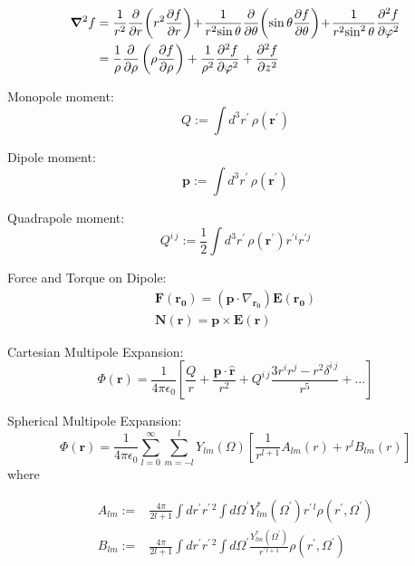 \documentclass[a4paper, twocolumn]{article}
\renewcommand{\vec}[1]{\boldsymbol{#1}}
\begin{document}
\begin{align*}
    \vec{\nabla}^2 f
    &= {1 \over r^2}{\partial \over \partial r}\!\left(r^2 {\partial f \over \partial r}\right)
\!+\!{1 \over r^2\!\sin\theta}{\partial \over \partial \theta}\!\left(\sin\theta {\partial f \over \partial \theta}\right)
\!+\!{1 \over r^2\!\sin^2\theta}{\partial^2 f \over \partial \varphi^2} \\
    &= {1 \over \rho}{\partial \over \partial \rho}\left(\rho {\partial f \over \partial \rho}\right)
+ {1 \over \rho^2}{\partial^2 f \over \partial \varphi^2}
+ {\partial^2 f \over \partial z^2}
\end{align*}

Monopole moment:
\begin{equation*}
    Q := \int d^{3}r^{\prime} \, \rho(\vec{r}^{\prime})
\end{equation*}

Dipole moment:
\begin{equation*}
    \vec{p} := \int d^{3}r^{\prime} \, \rho(\vec{r}^{\prime})
\end{equation*}

Quadrapole moment:
\begin{equation*}
    Q^{i \, j} := \frac{1}{2} \int d^{3} r^{\prime} \, \rho(\vec{r}^{\prime}) r^{\prime i} r^{\prime j}
\end{equation*}

Force and Torque on Dipole:
\begin{align*}
    \vec{F}(\vec{r_{0}}) = (\vec{p} \cdot \nabla_{\vec{r_{0}}}) \vec{E}(\vec{r_{0}}) \\
    \vec{N}(\vec{r}) = \vec{p} \times \vec{E}(\vec{r})
\end{align*}

Cartesian Multipole Expansion:
\begin{equation*}
    \Phi(\vec{r}) = \frac{1}{4 \pi \epsilon_{0}} \left[ \frac{Q}{r} + \frac{\vec{p} \cdot \hat{\vec{r}}}{r^{2}} + Q^{i \, j} \frac{3r^{i}r^{j} - r^{2}\delta^{i\,j}}{r^5} + \dots \right]
\end{equation*}

Spherical Multipole Expansion:
\begin{equation*}
    \Phi(\vec{r}) = \frac{1}{4 \pi \epsilon_{0}} \sum\limits_{l=0}^{\infty} \sum\limits_{m=-l}^{l} Y_{lm}(\Omega) \left[ \frac{1}{r^{l+1}} A_{lm}(r) + r^{l} B_{lm}(r) \right]
\end{equation*}
where

\begin{align*}
    A_{lm} :=& \frac{4 \pi}{2l + 1} \int d r^{\prime} r^{\prime \, 2} \int d \Omega^{\prime} Y_{lm}^{*}(\Omega^{\prime}) r^{\prime \, l} \rho(r^{\prime}, \Omega^{\prime}) \\
    B_{lm} :=& \frac{4 \pi}{2l + 1} \int d r^{\prime} r^{\prime \, 2} \int d \Omega^{\prime}  \frac{Y_{lm}^{*}(\Omega^{\prime})}{r^{\prime \, l+1}} \rho(r^{\prime}, \Omega^{\prime})
\end{align*}
\end{document}
